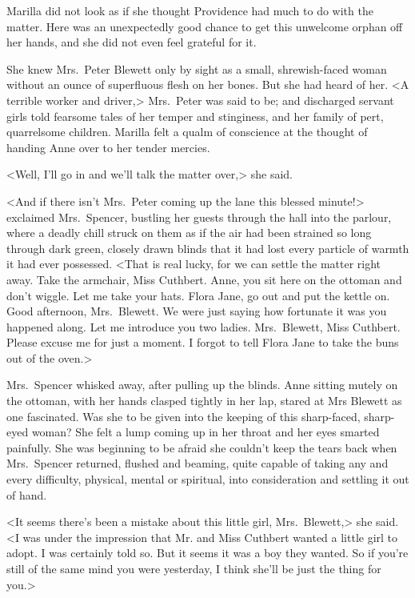 Marilla did not look as if she thought Providence had much to do with the matter. Here was an unexpectedly good chance to get this unwelcome orphan off her hands, and she did not even feel grateful for it.

She knew Mrs.~Peter Blewett only by sight as a small, shrewish-faced woman without an ounce of superfluous flesh on her bones. But she had heard of her. <A terrible worker and driver,> Mrs.~Peter was said to be; and discharged servant girls told fearsome tales of her temper and stinginess, and her family of pert, quarrelsome children. Marilla felt a qualm of conscience at the thought of handing Anne over to her tender mercies.

<Well, I'll go in and we'll talk the matter over,> she said.

<And if there isn't Mrs.~Peter coming up the lane this blessed minute!> exclaimed Mrs.~Spencer, bustling her guests through the hall into the parlour, where a deadly chill struck on them as if the air had been strained so long through dark green, closely drawn blinds that it had lost every particle of warmth it had ever possessed. <That is real lucky, for we can settle the matter right away. Take the armchair, Miss Cuthbert. Anne, you sit here on the ottoman and don't wiggle. Let me take your hats. Flora Jane, go out and put the kettle on. Good afternoon, Mrs.~Blewett. We were just saying how fortunate it was you happened along. Let me introduce you two ladies. Mrs.~Blewett, Miss Cuthbert. Please excuse me for just a moment. I forgot to tell Flora Jane to take the buns out of the oven.>

Mrs.~Spencer whisked away, after pulling up the blinds. Anne sitting mutely on the ottoman, with her hands clasped tightly in her lap, stared at Mrs Blewett as one fascinated. Was she to be given into the keeping of this sharp-faced, sharp-eyed woman? She felt a lump coming up in her throat and her eyes smarted painfully. She was beginning to be afraid she couldn't keep the tears back when Mrs.~Spencer returned, flushed and beaming, quite capable of taking any and every difficulty, physical, mental or spiritual, into consideration and settling it out of hand.

<It seems there's been a mistake about this little girl, Mrs.~Blewett,> she said. <I was under the impression that Mr. and Miss Cuthbert wanted a little girl to adopt. I was certainly told so. But it seems it was a boy they wanted. So if you're still of the same mind you were yesterday, I think she'll be just the thing for you.>


